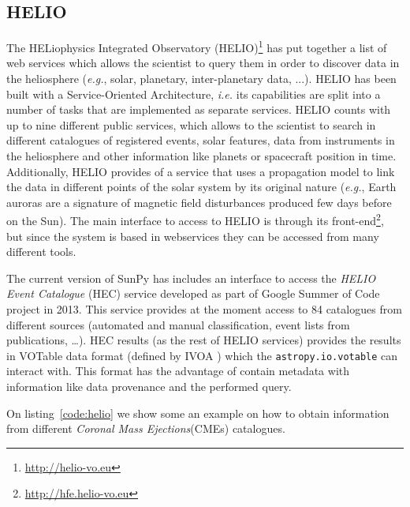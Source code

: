 \subsection{HELIO}\label{ssec:helio}

The HELiophysics Integrated Observatory 
(HELIO)\footnote{\url{http://helio-vo.eu}} has put together a list of web 
services which allows the scientist to query them in order to discover data in 
the heliosphere (\textit{e.g.}, solar, planetary, inter-planetary data, 
...)\cite{dps2012}. 
HELIO has been built with a Service-Oriented Architecture, 
\textit{i.e.} its capabilities are split into a number of tasks that are 
implemented as separate services. 
HELIO counts with up to nine different public services, which allows to the 
scientist to search in different catalogues of registered events, solar features,
data from instruments in the heliosphere and other information like planets or 
spacecraft position in time. 
Additionally, HELIO provides of a service that uses a propagation model to link 
the data in different points of the solar system by its original nature 
(\textit{e.g.}, Earth auroras are a signature of magnetic field disturbances 
produced few days before on the Sun).
The main interface to access to HELIO is through its front-end\footnote{
\url{http://hfe.helio-vo.eu}},
but since the system is based in webservices they can be accessed from many different tools.

The current version of SunPy has includes an interface to access the 
\textit{HELIO Event Catalogue} (HEC) service developed as part of Google
Summer of Code project in 2013.
This service provides at the moment access to 84 catalogues from different
sources (automated and manual classification, event lists from publications, \ldots).
HEC results (as the rest of HELIO services) provides the results in VOTable 
data format (defined by IVOA \cite{ochsenbein_ivoa_2011})
which the \texttt{astropy.io.votable} can interact with.
This format has the advantage of contain metadata with information like
data provenance and the performed query.

On listing~\ref{code:helio} we show some an example on how to obtain information
from different \textit{Coronal Mass Ejections}(CMEs) catalogues.

